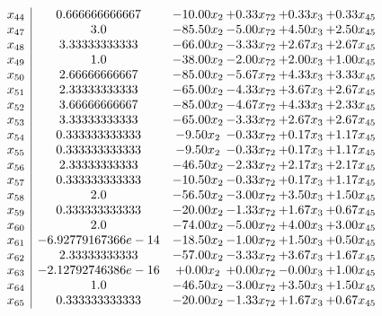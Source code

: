 \documentclass[8pt]{article}
\begin{document}
\[\begin{array}{c| c c@{\hskip 2pt} c@{\hskip 2pt} c@{\hskip 2pt} c@{\hskip 2pt} }
 x_{44}   &  0.666666666667 & -10.00 x_{2} & +  0.33 x_{72} & +  0.33 x_{3} & +  0.33 x_{45}\\
 x_{47}   &  3.0 & -85.50 x_{2} & -5.00 x_{72} & +  4.50 x_{3} & +  2.50 x_{45}\\
 x_{48}   &  3.33333333333 & -66.00 x_{2} & -3.33 x_{72} & +  2.67 x_{3} & +  2.67 x_{45}\\
 x_{49}   &  1.0 & -38.00 x_{2} & -2.00 x_{72} & +  2.00 x_{3} & +  1.00 x_{45}\\
 x_{50}   &  2.66666666667 & -85.00 x_{2} & -5.67 x_{72} & +  4.33 x_{3} & +  3.33 x_{45}\\
 x_{51}   &  2.33333333333 & -65.00 x_{2} & -4.33 x_{72} & +  3.67 x_{3} & +  2.67 x_{45}\\
 x_{52}   &  3.66666666667 & -85.00 x_{2} & -4.67 x_{72} & +  4.33 x_{3} & +  2.33 x_{45}\\
 x_{53}   &  3.33333333333 & -65.00 x_{2} & -3.33 x_{72} & +  2.67 x_{3} & +  2.67 x_{45}\\
 x_{54}   &  0.333333333333 & -9.50 x_{2} & -0.33 x_{72} & +  0.17 x_{3} & +  1.17 x_{45}\\
 x_{55}   &  0.333333333333 & -9.50 x_{2} & -0.33 x_{72} & +  0.17 x_{3} & +  1.17 x_{45}\\
 x_{56}   &  2.33333333333 & -46.50 x_{2} & -2.33 x_{72} & +  2.17 x_{3} & +  2.17 x_{45}\\
 x_{57}   &  0.333333333333 & -10.50 x_{2} & -0.33 x_{72} & +  0.17 x_{3} & +  1.17 x_{45}\\
 x_{58}   &  2.0 & -56.50 x_{2} & -3.00 x_{72} & +  3.50 x_{3} & +  1.50 x_{45}\\
 x_{59}   &  0.333333333333 & -20.00 x_{2} & -1.33 x_{72} & +  1.67 x_{3} & +  0.67 x_{45}\\
 x_{60}   &  2.0 & -74.00 x_{2} & -5.00 x_{72} & +  4.00 x_{3} & +  3.00 x_{45}\\
 x_{61}   &  -6.92779167366e-14 & -18.50 x_{2} & -1.00 x_{72} & +  1.50 x_{3} & +  0.50 x_{45}\\
 x_{62}   &  2.33333333333 & -57.00 x_{2} & -3.33 x_{72} & +  3.67 x_{3} & +  1.67 x_{45}\\
 x_{63}   &  -2.12792746386e-16 & +  0.00 x_{2} & +  0.00 x_{72} & -0.00 x_{3} & +  1.00 x_{45}\\
 x_{64}   &  1.0 & -46.50 x_{2} & -3.00 x_{72} & +  3.50 x_{3} & +  1.50 x_{45}\\
 x_{65}   &  0.333333333333 & -20.00 x_{2} & -1.33 x_{72} & +  1.67 x_{3} & +  0.67 x_{45}\\

\end{array}\]
\end{document}

